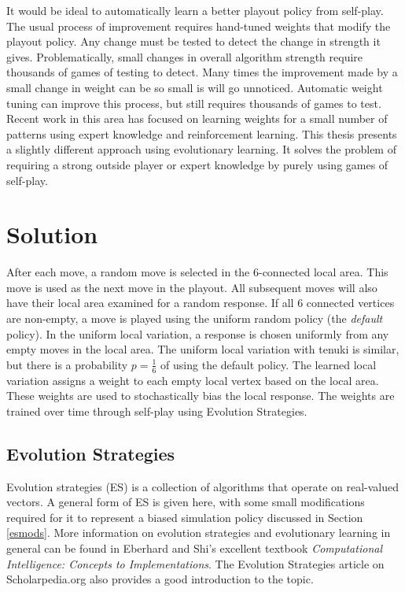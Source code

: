 \documentclass[11pt]{report}
\begin{document}
It would be ideal to automatically learn a better playout policy from self-play. The usual process of improvement requires hand-tuned weights that modify the playout policy. Any change must be tested to detect the change in strength it gives. Problematically, small changes in overall algorithm strength require thousands of games of testing to detect. Many times the improvement made by a small change in weight can be so small is will go unnoticed. Automatic weight tuning can improve this process, but still requires thousands of games to test. Recent work in this area has focused on learning weights for a small number of patterns using expert knowledge and reinforcement learning\cite{silver2009monte}. This thesis presents a slightly different approach using evolutionary learning. It solves the problem of requiring a strong outside player or expert knowledge by purely using games of self-play.

\section{Solution}\label{solution}
After each move, a random move is selected in the 6-connected local area. This move is used as the next move in the playout. All subsequent moves will also have their local area examined for a random response. If all 6 connected vertices are non-empty, a move is played using the uniform random policy (the \emph{default} policy). In the uniform local variation, a response is chosen uniformly from any empty moves in the local area. The uniform local variation with tenuki is similar, but there is a probability $p=\frac{1}{6}$ of using the default policy. The learned local variation assigns a weight to each empty local vertex based on the local area. These weights are used to stochastically bias the local response. The weights are trained over time through self-play using Evolution Strategies.

\subsection{Evolution Strategies}
Evolution strategies (ES) is a collection of algorithms that operate on real-valued vectors. A general form of ES is given here, with some small modifications required for it to represent a biased simulation policy discussed in Section \ref{esmods}. More information on evolution strategies and evolutionary learning in general can be found in Eberhard and Shi's excellent textbook \emph{Computational Intelligence: Concepts to Implementations}\cite{eberhart2007computational}. The Evolution Strategies article on Scholarpedia.org also provides a good introduction to the topic\cite{Beyer:2007}.
\end{document}
